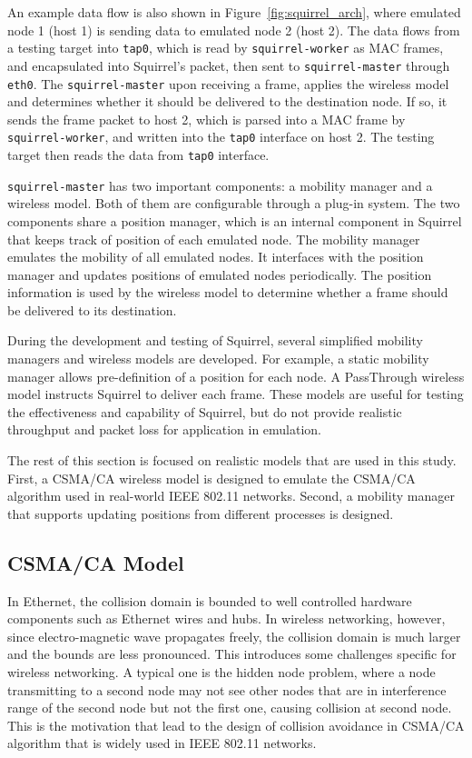 \documentclass[12pt]{report}
\begin{document}
An example data flow is also shown in Figure~\ref{fig:squirrel_arch}, where emulated node 1 (host 1) is sending data to emulated node 2 (host 2). The data flows from a testing target into \texttt{tap0}, which is read by \texttt{squirrel-worker} as MAC frames, and encapsulated into Squirrel's packet, then sent to \texttt{squirrel-master} through \texttt{eth0}. The \texttt{squirrel-master} upon receiving a frame, applies the wireless model and determines whether it should be delivered to the destination node. If so, it sends the frame packet to host 2, which is parsed into a MAC frame by \texttt{squirrel-worker}, and written into the \texttt{tap0} interface on host 2. The testing target then reads the data from \texttt{tap0} interface.

\texttt{squirrel-master} has two important components: a mobility manager and a wireless model. Both of them are configurable through a plug-in system. The two components share a position manager, which is an internal component in Squirrel that keeps track of position of each emulated node. The mobility manager emulates the mobility of all emulated nodes. It interfaces with the position manager and updates positions of emulated nodes periodically. The position information is used by the wireless model to determine whether a frame should be delivered to its destination.

During the development and testing of Squirrel, several simplified mobility managers and wireless models are developed. For example, a static mobility manager allows pre-definition of a position for each node. A PassThrough wireless model instructs Squirrel to deliver each frame. These models are useful for testing the effectiveness and capability of Squirrel, but do not provide realistic throughput and packet loss for application in emulation.

The rest of this section is focused on realistic models that are used in this study. First, a CSMA/CA wireless model is designed to emulate the CSMA/CA algorithm used in real-world IEEE 802.11 networks. Second, a mobility manager that supports updating positions from different processes is designed.

\subsection{CSMA/CA Model}
\label{sec:squirrel_csmaca}

In Ethernet, the collision domain is bounded to well controlled hardware components such as Ethernet wires and hubs. In wireless networking, however, since electro-magnetic wave propagates freely, the collision domain is much larger and the bounds are less pronounced. This introduces some challenges specific for wireless networking. A typical one is the hidden node problem, where a node transmitting to a second node may not see other nodes that are in interference range of the second node but not the first one, causing collision at second node. This is the motivation that lead to the design of collision avoidance in CSMA/CA algorithm that is widely used in IEEE 802.11 networks.
\end{document}
